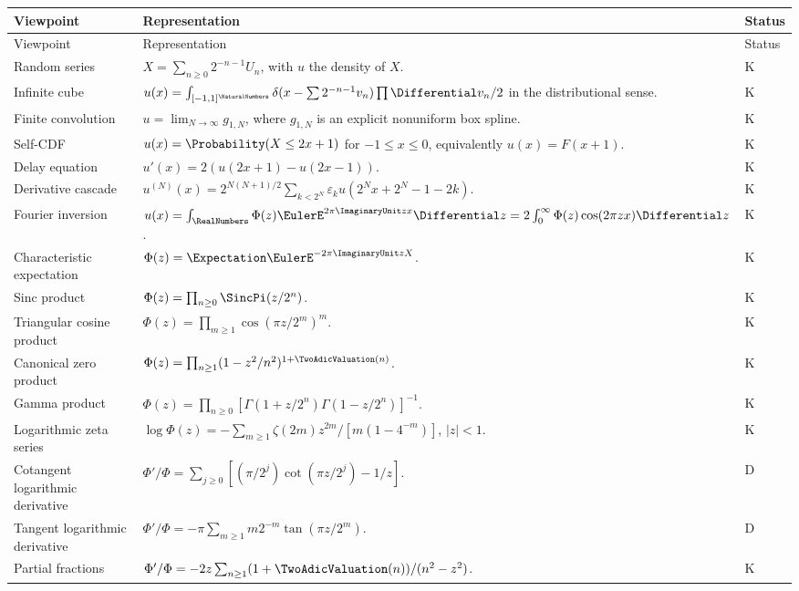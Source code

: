 \documentclass[11pt]{article}
\theoremstyle{definition}
\theoremstyle{remark}
\newcommand{\eps}{\varepsilon}
\newcommand{\statusknown}{\textsf{K}}
\newcommand{\statusderived}{\textsf{D}}
\begin{document}
\renewcommand{\arraystretch}{1.22}
\begin{longtable}{@{}p{}p{}p{}@{}}
\toprule
Viewpoint & Representation & Status\\
\midrule
\endfirsthead
\toprule
Viewpoint & Representation & Status\\
\midrule
\endhead
Random series &
$X=\sum_{n\ge0}2^{-n-1}U_n$, with $u$ the density of $X$. & \statusknown\\
Infinite cube &
$u(x)=\int_{[-1,1]^{\NaturalNumbers}}\delta(x-\sum2^{-n-1}v_n)\prod\Differential v_n/2$ in the distributional sense. & \statusknown\\
Finite convolution &
$u=\lim_{N\to\infty}g_{1,N}$, where $g_{1,N}$ is an explicit nonuniform box spline. & \statusknown\\
Self-CDF &
$u(x)=\Probability(X\le2x+1)$ for $-1\le x\le0$, equivalently $u(x)=F(x+1)$. & \statusknown\\
Delay equation &
$u'(x)=2(u(2x+1)-u(2x-1))$. & \statusknown\\
Derivative cascade &
$u^{(N)}(x)=2^{N(N+1)/2}\sum_{k<2^N}\eps_k
u(2^Nx+2^N-1-2k)$. & \statusknown\\
Fourier inversion &
$u(x)=\int_{\RealNumbers}\Phi(z)\EulerE^{2\pi\ImaginaryUnit zx}\Differential z
=2\int_0^\infty\Phi(z)\cos(2\pi zx)\Differential z$. & \statusknown\\
Characteristic expectation &
$\Phi(z)=\Expectation\EulerE^{-2\pi\ImaginaryUnit zX}$. & \statusknown\\
Sinc product &
$\Phi(z)=\prod_{n\ge0}\SincPi(z/2^n)$. & \statusknown\\
Triangular cosine product &
$\Phi(z)=\prod_{m\ge1}\cos(\pi z/2^m)^m$. & \statusknown\\
Canonical zero product &
$\Phi(z)=\prod_{n\ge1}(1-z^2/n^2)^{1+\TwoAdicValuation(n)}$. & \statusknown\\
Gamma product &
$\Phi(z)=\prod_{n\ge0}[\Gamma(1+z/2^n)\Gamma(1-z/2^n)]^{-1}$. & \statusknown\\
Logarithmic zeta series &
$\log\Phi(z)=-\sum_{m\ge1}\zeta(2m)z^{2m}/[m(1-4^{-m})]$, $|z|<1$. & \statusknown\\
Cotangent logarithmic derivative &
$\Phi'/\Phi=\sum_{j\ge0}[(\pi/2^j)\cot(\pi z/2^j)-1/z]$. & \statusderived\\
Tangent logarithmic derivative &
$\Phi'/\Phi=-\pi\sum_{m\ge1}m2^{-m}\tan(\pi z/2^m)$. & \statusderived\\
Partial fractions &
$\Phi'/\Phi=-2z\sum_{n\ge1}(1+\TwoAdicValuation(n))/(n^2-z^2)$. & \statusknown\\

\end{longtable}
\end{document}
